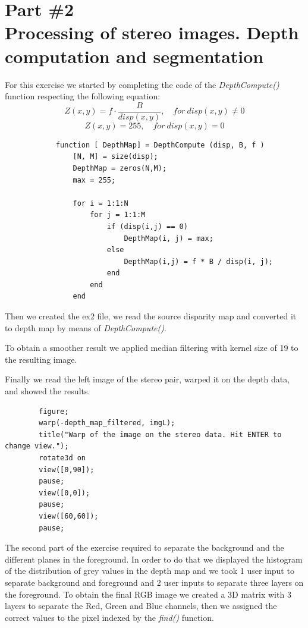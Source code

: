 \documentclass[12pt,a4paper,oneside,final,titlepage,openany,onecolumn]{article}
\begin{document}
	\section*{{\small Part \#2} \\ Processing of stereo images. Depth computation and segmentation}
		\par
		For this exercise we started by completing the code of the \textit{DepthCompute()} function respecting the following equation:
		\[Z(x, y) = f\cdot\dfrac{B}{disp(x, y)},\quad for\ disp(x, y) \neq 0\]
		\[Z(x, y) = 255,\quad for\ disp(x, y) = 0 \]
		\begin{lstlisting}
			function [ DepthMap] = DepthCompute (disp, B, f )
				[N, M] = size(disp);
				DepthMap = zeros(N,M);
				max = 255;
				
				for i = 1:1:N
					for j = 1:1:M
						if (disp(i,j) == 0)
							DepthMap(i, j) = max;
						else
							DepthMap(i,j) = f * B / disp(i, j);
						end
					end
				end
		\end{lstlisting}
		Then we created the ex2 file, we read the source disparity map and converted it to depth map by means of \textit{DepthCompute()}.
		\newline
		\par
		To obtain a smoother result we applied median filtering with kernel size of 19 to the resulting image.
		\newline
		\par
		Finally we read the left image of the stereo pair, warped it on the depth data, and showed the results.
		\begin{lstlisting}
		figure;
		warp(-depth_map_filtered, imgL);
		title("Warp of the image on the stereo data. Hit ENTER to change view.");
		rotate3d on
		view([0,90]);
		pause;
		view([0,0]);
		pause;
		view([60,60]);
		pause;
		\end{lstlisting}
		\par
		The second part of the exercise required to separate the background and the different planes in the foreground.
		\newline
		In order to do that we displayed the histogram of the distribution of grey values in the depth map and we took 1 user input to separate background and foreground and 2 user inputs to separate three layers on the foreground.
		\newline
		To obtain the final RGB image we created a 3D matrix with 3 layers to separate the Red, Green and Blue channels, then we assigned the correct values to the pixel indexed by the \textit{find()} function.
\end{document}
